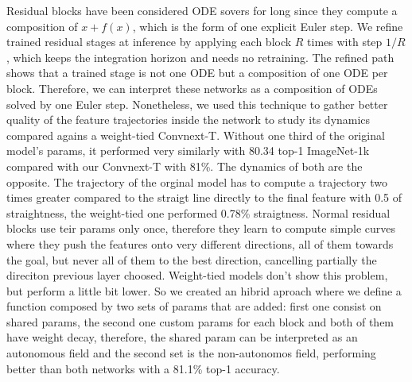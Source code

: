 \documentclass{article}
\theoremstyle{plain}
\theoremstyle{definition}
\theoremstyle{remark}
\begin{document}
Residual blocks have been considered ODE sovers for long since they compute a composition of
$x + f(x)$, which is the form of one explicit Euler step.
We refine trained residual stages at inference by applying each block $R$ times with
step $1/R$, which keeps the integration horizon and needs no retraining.
The refined path shows that a trained stage is not one ODE but a composition of one
ODE per block. Therefore, we can interpret these networks as a composition of ODEs solved by
one Euler step.
Nonetheless, we used this technique to gather better quality of the feature trajectories inside the
network to study its dynamics compared agains a weight-tied Convnext-T.
Without one third of the original model's params, it performed very similarly with 80.34\5 top-1 ImageNet-1k
compared with our Convnext-T with 81\%.
The dynamics of both are the opposite. The trajectory of the orginal model has to compute a trajectory two times
greater compared to the straigt line directly to the final feature with 0.5 of straightness, the weight-tied one
performed 0.78\% straigtness. Normal residual blocks use teir params only once, therefore they learn to
compute simple curves where they push the features onto very different directions, all of them towards the goal,
but never all of them to the best direction, cancelling partially the direciton previous layer choosed. Weight-tied
models don't show this problem, but perform a little bit lower. So we created an hibrid aproach where we define
a function composed by two sets of params that are added: first one consist on shared params, the second one
custom params for each block and both of them have weight decay, therefore, the shared param can be interpreted as
an autonomous field and the second set is the non-autonomos field, performing better than both networks with a 81.1\% top-1 accuracy.












\newpage

\end{document}
